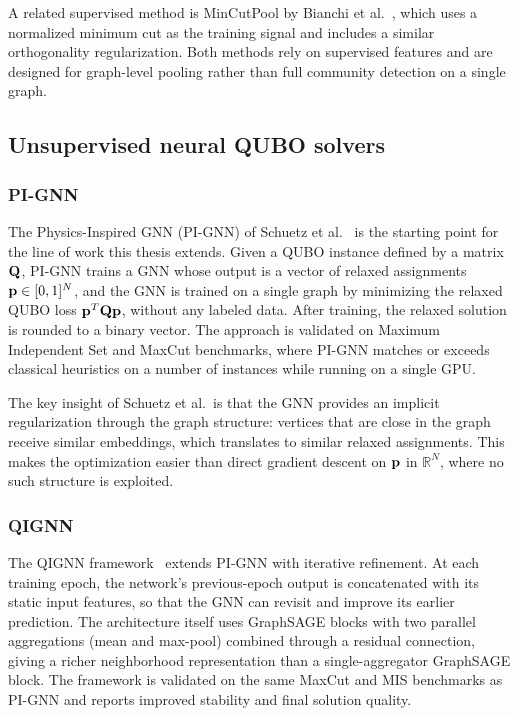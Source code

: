 A related supervised method is MinCutPool by Bianchi et
al.~\cite{bianchi2020spectral}, which uses a normalized minimum
cut as the training signal and includes a similar orthogonality
regularization. Both methods rely on supervised features and are
designed for graph-level pooling rather than full community
detection on a single graph.

\subsection{Unsupervised neural QUBO solvers}
\label{sec:rw_unsupervised}

\subsubsection{PI-GNN}
\label{sec:rw_pignn}

The Physics-Inspired GNN (PI-GNN) of Schuetz et
al.~\cite{schuetz2022combinatorial} is the starting point for the
line of work this thesis extends. Given a QUBO instance defined by
a matrix $\mathbf{Q}$, PI-GNN trains a GNN whose output is a vector of
relaxed assignments $\mathbf{p} \in [0,1]^N$, and the GNN is trained on a
single graph by minimizing the relaxed QUBO loss $\mathbf{p}^T \mathbf{Q} \mathbf{p}$,
without any labeled data. After training, the relaxed solution is
rounded to a binary vector. The approach is validated on Maximum
Independent Set and MaxCut benchmarks, where PI-GNN matches or
exceeds classical heuristics on a number of instances while running
on a single GPU.

The key insight of Schuetz et al.\ is that the GNN provides an
implicit regularization through the graph structure: vertices that
are close in the graph receive similar embeddings, which translates
to similar relaxed assignments. This makes the optimization easier
than direct gradient descent on $\mathbf{p}$ in $\mathbb{R}^N$, where no
such structure is exploited.

\subsubsection{QIGNN}
\label{sec:rw_qignn}

The QIGNN framework~\cite{qignn2026} extends PI-GNN with iterative
refinement. At each training epoch, the network's previous-epoch
output is concatenated with its static input features, so that the
GNN can revisit and improve its earlier prediction. The
architecture itself uses GraphSAGE blocks with two parallel
aggregations (mean and max-pool) combined through a residual
connection, giving a richer neighborhood representation than a
single-aggregator GraphSAGE block. The framework is validated on
the same MaxCut and MIS benchmarks as PI-GNN and reports improved
stability and final solution quality.


